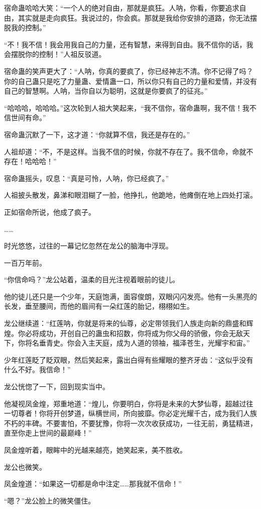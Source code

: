 \begin{this_body}
宿命蛊哈哈大笑：“一个人的绝对自由，那就是疯狂。人呐，你看，你要追求自由，其实就是走向疯狂。我说过的，你会疯。那就是我给你安排的道路，你无法摆脱我的控制。”

“不！我不信！我会用我自己的力量，还有智慧，来得到自由。我不信你的话，我会摆脱你的控制！”人祖反驳道。

宿命蛊的笑声更大了：“人呐，你真的要疯了，你已经神志不清。你不记得了吗？你的自己蛊只是吃了力量蛊、爱情蛊一口，所以你只有自己的力量和爱情，并没有自己的智慧啊。人呐，当你自以为聪明，这就是你要疯了的征兆。”

“哈哈哈，哈哈哈。”这次轮到人祖大笑起来，“我不信你，宿命蛊啊，我不信！我不信世间有命。”

宿命蛊沉默了一下，这才道：“你就算不信，我还是存在的。”

人祖却道：“不，不是这样。当我不信的时候，你就不存在了。我不信命，命就不存在！哈哈哈！”

宿命蛊摇头，叹息：“真是可怜，人呐，你已经疯了。”

人祖披头散发，鼻涕和眼泪糊了一脸，他挣扎，他跪地，他瘫倒在地上四处打滚。

正如宿命所说，他成了疯子。

……

时光悠悠，过往的一幕记忆忽然在龙公的脑海中浮现。

一百万年前。

“你信命吗？”龙公站着，温柔的目光注视着眼前的徒儿。

他的徒儿还只是一个少年，天庭饱满，面容俊朗，双眼闪闪发亮。他有一头黑亮的长发，垂至腰间，而他的眉间有一朵红莲的胎记，栩栩如生。

龙公继续道：“红莲呐，你就是将来的仙尊，必定带领我们人族走向新的鼎盛和辉煌。你必将成功，开创自己的蛊虫和招数，你将成为你父母的骄傲，你会无敌天下，你将名垂青史。你会入主天庭，成为人道的领袖，福泽苍生，光耀宇和宙。”

少年红莲眨了眨双眼，然后笑起来，露出白得有些耀眼的整齐牙齿：“这似乎没有什么不好。我信命！”

龙公恍惚了一下，回到现实当中。

他凝视凤金煌，郑重地道：“煌儿，你要明白，你将是未来的大梦仙尊，超越过往一切尊者！你将开创梦道，纵横世间，所向披靡。你必定光耀千古，成为我们人族不朽的丰碑。不要害怕，不要犹豫，你将一次次收获成功，一往无前，勇猛精进，直至你走上世间的最巅峰！”

凤金煌听着，眼眸中的光越来越亮，她笑起来，美不胜收。

龙公也微笑。

凤金煌道：“如果这一切都是命中注定……那我就不信命！”

“嗯？”龙公脸上的微笑僵住。

\end{this_body}

